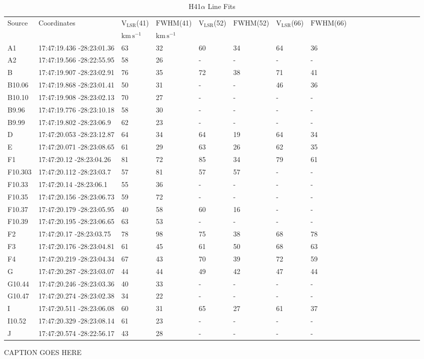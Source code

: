 \begin{table}[htp]
\caption{H41$\alpha$ Line Fits}

\begin{tabular}{llllllllllllllllll}
\label{tab:h41afits}
Source & Coordinates & V$_\mathrm{LSR}$(41) & $\mathrm{FWHM}$(41) & V$_\mathrm{LSR}$(52) & $\mathrm{FWHM}$(52) & V$_\mathrm{LSR}$(66) & $\mathrm{FWHM}$(66) \\
 &  & $\mathrm{km\,s^{-1}}$ & $\mathrm{km\,s^{-1}}$ &  &  &  &  \\
\hline
A1 & 17:47:19.436 -28:23:01.36 & 63 & 32 & 60 & 34 & 64 & 36 \\
A2 & 17:47:19.566 -28:22:55.95 & 58 & 26 & - & - & - & - \\
B & 17:47:19.907 -28:23:02.91 & 76 & 35 & 72 & 38 & 71 & 41 \\
B10.06 & 17:47:19.868 -28:23:01.41 & 50 & 31 & - & - & 46 & 36 \\
B10.10 & 17:47:19.908 -28:23:02.13 & 70 & 27 & - & - & - & - \\
B9.96 & 17:47:19.776 -28:23:10.18 & 58 & 30 & - & - & - & - \\
B9.99 & 17:47:19.802 -28:23:06.9 & 62 & 23 & - & - & - & - \\
D & 17:47:20.053 -28:23:12.87 & 64 & 34 & 64 & 19 & 64 & 34 \\
E & 17:47:20.071 -28:23:08.65 & 61 & 29 & 63 & 26 & 62 & 35 \\
F1 & 17:47:20.12 -28:23:04.26 & 81 & 72 & 85 & 34 & 79 & 61 \\
F10.303 & 17:47:20.112 -28:23:03.7 & 57 & 81 & 57 & 57 & - & - \\
F10.33 & 17:47:20.14 -28:23:06.1 & 55 & 36 & - & - & - & - \\
F10.35 & 17:47:20.156 -28:23:06.73 & 59 & 72 & - & - & - & - \\
F10.37 & 17:47:20.179 -28:23:05.95 & 40 & 58 & 60 & 16 & - & - \\
F10.39 & 17:47:20.195 -28:23:06.65 & 63 & 53 & - & - & - & - \\
F2 & 17:47:20.17 -28:23:03.75 & 78 & 98 & 75 & 38 & 68 & 78 \\
F3 & 17:47:20.176 -28:23:04.81 & 61 & 45 & 61 & 50 & 68 & 63 \\
F4 & 17:47:20.219 -28:23:04.34 & 67 & 43 & 70 & 39 & 72 & 59 \\
G & 17:47:20.287 -28:23:03.07 & 44 & 44 & 49 & 42 & 47 & 44 \\
G10.44 & 17:47:20.246 -28:23:03.36 & 40 & 33 & - & - & - & - \\
G10.47 & 17:47:20.274 -28:23:02.38 & 34 & 22 & - & - & - & - \\
I & 17:47:20.511 -28:23:06.08 & 60 & 31 & 65 & 27 & 61 & 37 \\
I10.52 & 17:47:20.329 -28:23:08.14 & 61 & 23 & - & - & - & - \\
J & 17:47:20.574 -28:22:56.17 & 43 & 28 & - & - & - & - \\
\hline
\end{tabular}
\par
CAPTION GOES HERE
\end{table}
